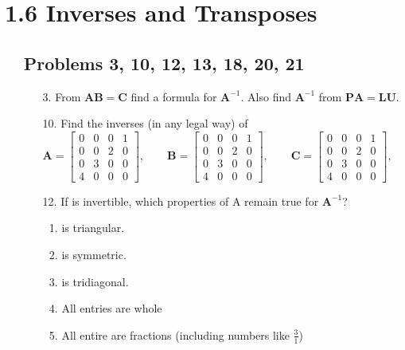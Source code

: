 \section{1.6 Inverses and Transposes}
\begin{itemize}
  \item []

    \subsection{Problems 3, 10, 12, 13, 18, 20, 21}
    \begin{itemize}\color{foreground-2}
      \item[3.] From \(\bm{AB} = \bm{C}\) find a formula for \(\bm{A}^{-1}\). Also
        find \(\bm{A}^{-1}\) from \(\bm{PA} = \bm{LU}\).

      \item[10.] Find the inverses (in any legal way) of
        \[%
        \bm{A} = \begin{bmatrix}
          0 & 0 & 0 & 1 \\
          0 & 0 & 2 & 0 \\
          0 & 3 & 0 & 0 \\
          4 & 0 & 0 & 0
        \end{bmatrix}, \qquad
        \bm{B} = \begin{bmatrix}
          0 & 0 & 0 & 1 \\
          0 & 0 & 2 & 0 \\
          0 & 3 & 0 & 0 \\
          4 & 0 & 0 & 0
        \end{bmatrix}, \qquad
        \bm{C} = \begin{bmatrix}
          0 & 0 & 0 & 1 \\
          0 & 0 & 2 & 0 \\
          0 & 3 & 0 & 0 \\
          4 & 0 & 0 & 0
        \end{bmatrix}, \qquad
        \]%

      \item[12.] If  is invertible, which properties of A remain true
        for \(\bm{A}^{-1}\)?
        \begin{enumerate}[label=(\alph*)]
          \item {} is triangular.
          \item {} is symmetric.
          \item {} is tridiagonal.
          \item All entries are whole
          \item All entire are fractions (including numbers like \( \tfrac{3}{1} \))
        \end{enumerate}


\end{itemize}
\end{itemize}
